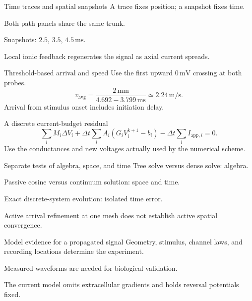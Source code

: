\documentclass[aspectratio=169,11pt]{beamer}
\newcommand{\notestarget}{notes.pdf}\newcommand{\noteslabel}{Notes}
\begin{document}
\renewcommand{\notestarget}{notes.pdf\#note-a-branched-neuronal-experiment}
\begin{frame}[t,fragile,label=slide-time-traces-and-spatial-snapshots]{Time traces and spatial snapshots}
A trace fixes position; a snapshot fixes time.\pause{}\par\medskip Both path panels share the same trunk.\par Snapshots: $2.5$, $3.5$, $4.5\,\mathrm{ms}$.\par\medskip Local ionic feedback regenerates the signal as axial current spreads.
\end{frame}
\renewcommand{\notestarget}{notes.pdf\#note-arrival-measurements-and-independent-numerical-checks}
\begin{frame}[t,fragile,label=slide-threshold-based-arrival-and-speed]{Threshold-based arrival and speed}
Use the first upward $0\,\mathrm{mV}$ crossing at both probes.\pause{}\[v_{\mathrm{avg}}=\frac{2\,\mathrm{mm}}{4.692-3.799\,\mathrm{ms}}\simeq2.24\,\mathrm{m/s}.\] Arrival from stimulus onset includes initiation delay.
\end{frame}
\renewcommand{\notestarget}{notes.pdf\#note-arrival-measurements-and-independent-numerical-checks}
\begin{frame}[t,fragile,label=slide-a-discrete-current-budget-residual]{A discrete current-budget residual}
\[\sum_iM_i\Delta V_i+\Delta t\sum_iA_i(G_iV_i^{k+1}-b_i)-\Delta t\sum_iI_{\mathrm{app},i}=0.\]\pause{} Use the conductances and new voltages actually used by the numerical scheme.
\end{frame}
\renewcommand{\notestarget}{notes.pdf\#note-arrival-measurements-and-independent-numerical-checks}
\begin{frame}[t,fragile,label=slide-separate-tests-of-algebra-space-and-time]{Separate tests of algebra, space, and time}
Tree solve versus dense solve: algebra.\par Passive cosine versus continuum solution: space and time.\par Exact discrete-system evolution: isolated time error.\pause{}\par\medskip Active arrival refinement at one mesh does not establish active spatial convergence.
\end{frame}
\renewcommand{\notestarget}{notes.pdf\#note-arrival-measurements-and-independent-numerical-checks}
\begin{frame}[t,fragile,label=slide-model-evidence-for-a-propagated-signal]{Model evidence for a propagated signal}
Geometry, stimulus, channel laws, and recording locations determine the experiment.\pause{}\par\medskip Measured waveforms are needed for biological validation.\par\medskip The current model omits extracellular gradients and holds reversal potentials fixed.
\end{frame}
\end{document}
